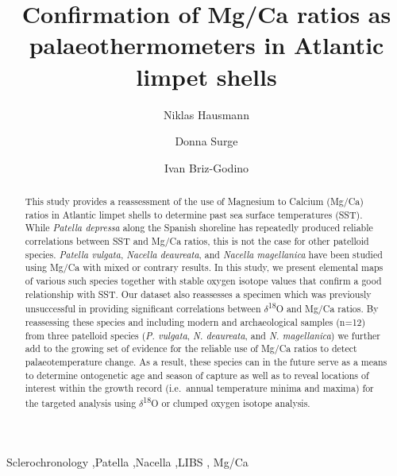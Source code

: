 \documentclass[
  authoryear,
  preprint,
  3p]{elsarticle}
\begin{document}
\begin{frontmatter}
\title{Confirmation of Mg/Ca ratios as palaeothermometers in Atlantic
limpet shells}
\author[1]{Niklas Hausmann%
%
}
\author[2]{Donna Surge%
%
}

\author[3]{Ivan Briz-Godino%
%
}






        
\begin{abstract}
This study provides a reassessment of the use of Magnesium to Calcium
(Mg/Ca) ratios in Atlantic limpet shells to determine past sea surface
temperatures (SST). While \emph{Patella depressa} along the Spanish
shoreline has repeatedly produced reliable correlations between SST and
Mg/Ca ratios, this is not the case for other patelloid species.
\emph{Patella vulgata}, \emph{Nacella deaureata}, and \emph{Nacella
magellanica} have been studied using Mg/Ca with mixed or contrary
results. In this study, we present elemental maps of various such
species together with stable oxygen isotope values that confirm a good
relationship with SST. Our dataset also reassesses a specimen which was
previously unsuccessful in providing significant correlations between
\(\delta\)\textsuperscript{18}O and Mg/Ca ratios. By reassessing these
species and including modern and archaeological samples (n=12) from
three patelloid species (\emph{P. vulgata}, \emph{N. deaureata}, and
\emph{N. magellanica}) we further add to the growing set of evidence for
the reliable use of Mg/Ca ratios to detect palaeotemperature change. As
a result, these species can in the future serve as a means to determine
ontogenetic age and season of capture as well as to reveal locations of
interest within the growth record (i.e.~annual temperature minima and
maxima) for the targeted analysis using \(\delta\)\textsuperscript{18}O
or clumped oxygen isotope analysis.
\end{abstract}





\begin{keyword}
    Sclerochronology \sep Patella \sep Nacella \sep LIBS \sep 
    Mg/Ca
\end{keyword}
\end{frontmatter}
    
\end{document}
